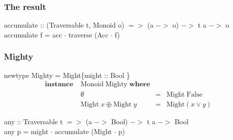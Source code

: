 \documentclass[18pt]{beamer}
\begin{document}
\begin{frame}[fragile] \frametitle{The result}
accumulate :: (Traversable t, Monoid o) $=>$ (a $->$ o) $->$ t a $->$ o
accumulate f = acc $\cdot$ traverse (Acc $\cdot$ f)
\end{frame}

\begin{frame} \frametitle{Mighty}
newtype Mighty = Might\{might :: Bool \}
\begin{align*}
\mathbf{instance} \; &\mathrm{Monoid \;  Mighty} \; \mathbf{where}\\
&\emptyset &=& \mathrm{Might} \; \mathrm{False}\\
&\mathrm{Might}\; x \oplus \mathrm{Might}\; y &=& \mathrm{Might} (x \lor y)
\end{align*}

any :: Traversable t $=>$ (a $->$ Bool) $->$ t a $->$ Bool\\
any p = might $\cdot$ accumulate (Might $\cdot$ p)
\end{frame}
\end{document}
